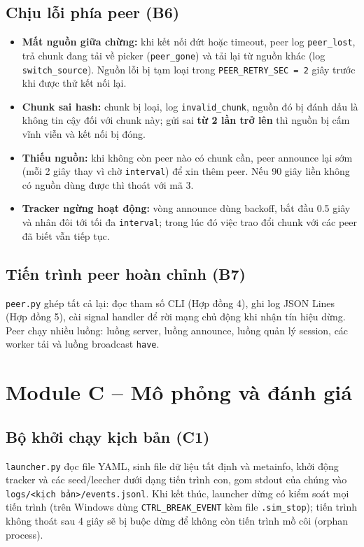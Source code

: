 \documentclass[12pt,a4paper,oneside]{report}
\begin{document}
\subsection{Chịu lỗi phía peer (B6)}
\begin{itemize}
  \item \textbf{Mất nguồn giữa chừng:} khi kết nối đứt hoặc timeout, peer log \texttt{peer\_lost}, trả chunk đang tải về picker (\texttt{peer\_gone}) và tải lại từ nguồn khác (log \texttt{switch\_source}). Nguồn lỗi bị tạm loại trong \texttt{PEER\_RETRY\_SEC = 2} giây trước khi được thử kết nối lại.
  \item \textbf{Chunk sai hash:} chunk bị loại, log \texttt{invalid\_chunk}, nguồn đó bị đánh dấu là không tin cậy đối với chunk này; gửi sai \textbf{từ 2 lần trở lên} thì nguồn bị cấm vĩnh viễn và kết nối bị đóng.
  \item \textbf{Thiếu nguồn:} khi không còn peer nào có chunk cần, peer announce lại sớm (mỗi 2 giây thay vì chờ \texttt{interval}) để xin thêm peer. Nếu 90 giây liền không có nguồn dùng được thì thoát với mã 3.
  \item \textbf{Tracker ngừng hoạt động:} vòng announce dùng backoff, bắt đầu 0.5 giây và nhân đôi tới tối đa \texttt{interval}; trong lúc đó việc trao đổi chunk với các peer đã biết vẫn tiếp tục.
\end{itemize}

\subsection{Tiến trình peer hoàn chỉnh (B7)}
\texttt{peer.py} ghép tất cả lại: đọc tham số CLI (Hợp đồng 4), ghi log JSON Lines (Hợp đồng 5), cài signal handler để rời mạng chủ động khi nhận tín hiệu dừng. Peer chạy nhiều luồng: luồng server, luồng announce, luồng quản lý session, các worker tải và luồng broadcast \texttt{have}.

\section{Module C -- Mô phỏng và đánh giá}

\subsection{Bộ khởi chạy kịch bản (C1)}
\texttt{launcher.py} đọc file YAML, sinh file dữ liệu tất định và metainfo, khởi động tracker và các seed/leecher dưới dạng tiến trình con, gom stdout của chúng vào \texttt{logs/<kịch bản>/events.jsonl}. Khi kết thúc, launcher dừng có kiểm soát mọi tiến trình (trên Windows dùng \texttt{CTRL\_BREAK\_EVENT} kèm file \texttt{.sim\_stop}); tiến trình không thoát sau 4 giây sẽ bị buộc dừng để không còn tiến trình mồ côi (orphan process).
\end{document}
